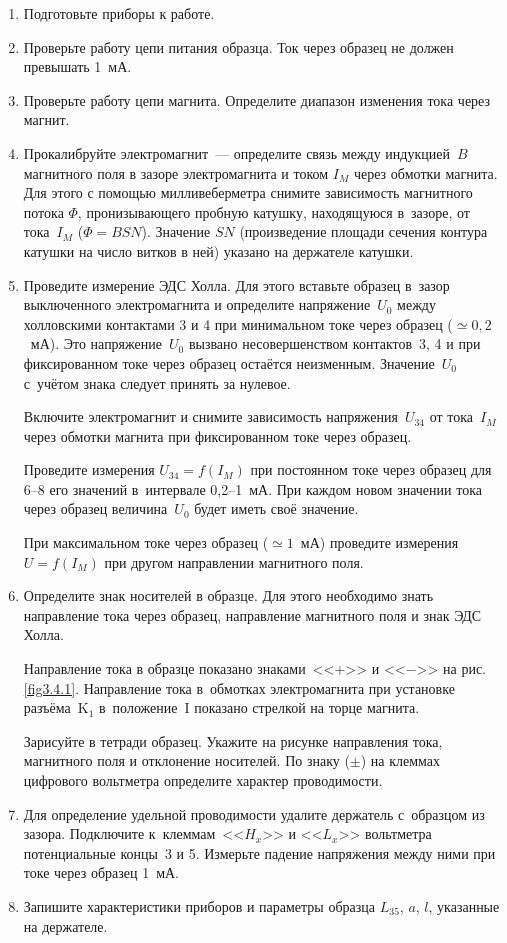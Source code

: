 \begin{enumerate}
\item{ Подготовьте приборы к работе.}

\item{ Проверьте работу цепи питания образца. Ток через образец не должен превышать 1~мА.}

\item{ Проверьте работу цепи магнита. Определите диапазон изменения тока через магнит.}

\item{ Прокалибруйте электромагнит~--- определите связь между индукцией~$B$ магнитного поля в зазоре электромагнита и током $I_M$ через обмотки магнита. Для этого с помощью милливеберметра снимите зависимость магнитного потока $\Phi$, пронизывающего пробную катушку, находящуюся в~зазоре, от тока~$I_M$ ($\Phi=BSN$). Значение $SN$ (произведение площади сечения контура катушки на число витков в ней) указано на держателе катушки.}

\item{ Проведите измерение ЭДС Холла. Для этого вставьте образец в~зазор выключенного электромагнита и определите напряжение~$U_0$ между холловскими контактами 3 и 4 при минимальном токе через образец ($\simeq 0,2$~мА). Это напряжение~$U_0$ вызвано несовершенством контактов~3, 4 и при фиксированном токе через образец остаётся неизменным. Значение~$U_0$ с~учётом знака следует принять за нулевое.

Включите электромагнит и снимите зависимость напряжения~$U_{34}$ от тока~$I_M$ через обмотки магнита при фиксированном токе через образец.

Проведите измерения $U_{34}=f(I_{M})$ при постоянном токе через образец для 6--8 его значений в~интервале 0,2--1~мА. При каждом новом значении тока через образец величина~$U_0$ будет иметь своё значение.

При максимальном токе через образец ($\simeq 1$~мА) проведите измерения $U=f(I_{M})$ при другом направлении магнитного поля.
}
\item{ Определите знак носителей в образце. Для этого необходимо знать направление тока через образец, направление магнитного поля и знак ЭДС Холла.

Направление тока в образце показано знаками~<<+>> и <<$-$>> на рис. \ref{fig3.4.1}. Направление тока в~обмотках электромагнита при установке разъёма~K$_1$ в~положение~I показано стрелкой на торце магнита.

Зарисуйте в тетради образец. Укажите на рисунке направления тока, магнитного поля и отклонение носителей. По знаку
($\pm$) на клеммах цифрового вольтметра определите характер проводимости.
}
\item{Для определение удельной проводимости удалите держатель с~образцом из зазора. Подключите к~клеммам~<<$H_{x}$>> и <<$L_{x}$>> вольтметра потенциальные концы~3 и 5. Измерьте падение напряжения между ними при токе через образец 1~мА.}

\item{ Запишите характеристики приборов и параметры образца $L_{35}$, $a$, $l$, указанные на держателе.}
\end{enumerate}

